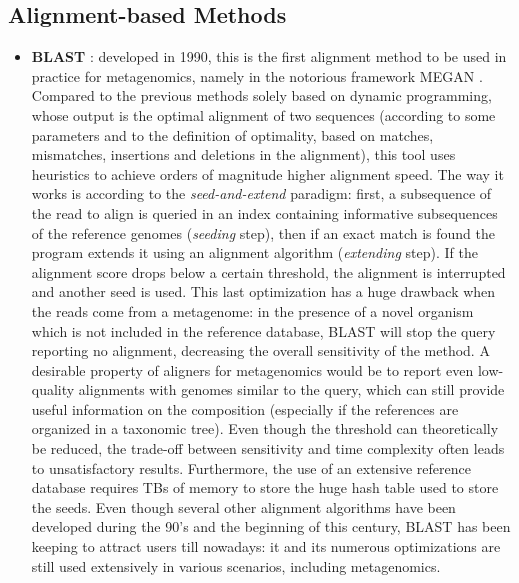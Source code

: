\subsection{Alignment-based Methods}
\begin{itemize}
    \item \textbf{BLAST} \cite{altschul_basic_1990}: developed in 1990, this is the first alignment method to be used in practice for metagenomics, namely in the notorious framework MEGAN \cite{huson_megan_2007}. Compared to the previous methods solely based on dynamic programming, whose output is the optimal alignment of two sequences (according to some parameters and to the definition of optimality, based on matches, mismatches, insertions and deletions in the alignment), this tool uses heuristics to achieve orders of magnitude higher alignment speed. The way it works is according to the \textit{seed-and-extend} paradigm: first, a subsequence of the read to align is queried in an index containing informative subsequences of the reference genomes (\textit{seeding} step), then if an exact match is found the program extends it using an alignment algorithm (\textit{extending} step). If the alignment score drops below a certain threshold, the alignment is interrupted and another seed is used. This last optimization has a huge drawback when the reads come from a metagenome: in the presence of a novel organism which is not included in the reference database, BLAST will stop the query reporting no alignment, decreasing the overall sensitivity of the method. A desirable property of aligners for metagenomics would be to report even low-quality alignments with genomes similar to the query, which can still provide useful information on the composition (especially if the references are organized in a taxonomic tree). Even though the threshold can theoretically be reduced, the trade-off between sensitivity and time complexity often leads to unsatisfactory results. Furthermore, the use of an extensive reference database requires TBs of memory to store the huge hash table used to store the seeds. Even though several other alignment algorithms have been developed during the 90's and the beginning of this century, BLAST has been keeping to attract users till nowadays: it and its numerous optimizations are still used extensively in various scenarios, including metagenomics.

\end{itemize}
